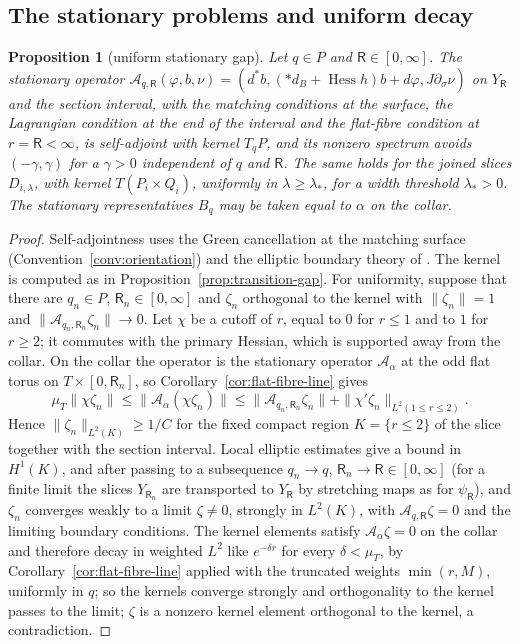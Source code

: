 \documentclass[11pt]{amsart}
\newtheorem{proposition}[theorem]{Proposition}
\theoremstyle{definition}
\theoremstyle{remark}
\theoremstyle{plain}
\numberwithin{equation}{section}
\begin{document}
\subsection{The stationary problems and uniform decay}

\begin{proposition}[uniform stationary gap]\label{prop:stationary-gap}
Let $q\in P$ and $\mathsf R\in[0,\infty]$. The stationary operator
$\mathcal A_{q,\mathsf R}(\varphi,b,\nu)=(d^*b,(*d_B+\operatorname{Hess}h)b+d\varphi,J\partial_\sigma\nu)$
on $Y_\mathsf R$ and the section interval, with the matching conditions at the surface,
the Lagrangian condition at the end of the interval and the flat-fibre
condition at $r=\mathsf R<\infty$, is self-adjoint with kernel $T_qP$, and its nonzero
spectrum avoids $(-\gamma,\gamma)$ for a $\gamma>0$ independent of $q$ and $\mathsf R$. The same
holds for the joined slices $D_{i,\lambda}$, with kernel $T(P_i\times Q_i)$,
uniformly in $\lambda\ge\lambda_*$, for a width threshold $\lambda_*>0$. The stationary representatives $B_q$ may be taken
equal to $\alpha$ on the collar.
\end{proposition}

\begin{proof}
Self-adjointness uses the Green cancellation at the matching surface
(Convention~\ref{conv:orientation}) and the elliptic boundary theory of
\cite{BB}. The kernel is computed as in Proposition~\ref{prop:transition-gap}.
For uniformity, suppose that there are $q_n\in P$, $\mathsf R_n\in[0,\infty]$ and $\zeta_n$
orthogonal to the kernel with $\|\zeta_n\|=1$ and $\|\mathcal A_{q_n,\mathsf R_n}\zeta_n\|\to0$. Let
$\chi$ be a cutoff of $r$, equal to $0$ for $r\le1$ and to $1$ for $r\ge2$; it commutes with
the primary Hessian, which is supported away from the collar. On the collar the
operator is the stationary operator $\mathcal A_\alpha$ at the odd flat torus on
$T\times[0,\mathsf R_n]$, so Corollary~\ref{cor:flat-fibre-line} gives
\[
\mu_T\|\chi\zeta_n\|\le\|\mathcal A_\alpha(\chi\zeta_n)\|\le\|\mathcal A_{q_n,\mathsf R_n}\zeta_n\|
+\|\chi'\zeta_n\|_{L^2(1\le r\le2)} .
\]
Hence $\|\zeta_n\|_{L^2(K)}\ge1/C$ for the fixed compact region $K=\{r\le2\}$ of the slice
together with the section interval. Local elliptic estimates give a bound in
$H^1(K)$, and after passing to a subsequence $q_n\to q$, $\mathsf R_n\to\mathsf R\in[0,\infty]$
(for a finite limit the slices $Y_{\mathsf R_n}$ are transported to $Y_{\mathsf R}$ by stretching
maps as for $\psi_{\mathsf R}$), and
$\zeta_n$ converges weakly to a limit $\zeta\ne0$, strongly in $L^2(K)$, with
$\mathcal A_{q,\mathsf R}\zeta=0$ and the limiting boundary conditions. The kernel elements
satisfy $\mathcal A_\alpha\zeta=0$ on the collar and therefore decay in weighted $L^2$ like
$e^{-\delta r}$ for every $\delta<\mu_T$, by Corollary~\ref{cor:flat-fibre-line} applied with the
truncated weights $\min(r,M)$, uniformly in $q$; so the kernels converge strongly
and orthogonality to the kernel passes to the limit;
$\zeta$ is a nonzero kernel element orthogonal to the kernel, a contradiction.
\end{proof}
\end{document}
